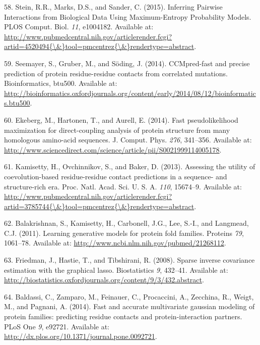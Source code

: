 \documentclass[12pt,a4paper,twoside]{book}
\theoremstyle{definition}
\theoremstyle{definition}
\theoremstyle{remark}
\begin{document}
\hypertarget{ref-Stein2015a}{}
58. Stein, R.R., Marks, D.S., and Sander, C. (2015). Inferring Pairwise
Interactions from Biological Data Using Maximum-Entropy Probability
Models. PLOS Comput. Biol. \emph{11}, e1004182. Available at:
\href{http://www.pubmedcentral.nih.gov/articlerender.fcgi?artid=4520494\%7B/\&\%7Dtool=pmcentrez\%7B/\&\%7Drendertype=abstract}{http://www.pubmedcentral.nih.gov/articlerender.fcgi?artid=4520494\{\textbackslash{}\&\}tool=pmcentrez\{\textbackslash{}\&\}rendertype=abstract}.

\hypertarget{ref-Seemayer2014}{}
59. Seemayer, S., Gruber, M., and Söding, J. (2014). CCMpred-fast and
precise prediction of protein residue-residue contacts from correlated
mutations. Bioinformatics, btu500. Available at:
\url{http://bioinformatics.oxfordjournals.org/content/early/2014/08/12/bioinformatics.btu500}.

\hypertarget{ref-Ekeberg2014}{}
60. Ekeberg, M., Hartonen, T., and Aurell, E. (2014). Fast
pseudolikelihood maximization for direct-coupling analysis of protein
structure from many homologous amino-acid sequences. J. Comput. Phys.
\emph{276}, 341--356. Available at:
\url{http://www.sciencedirect.com/science/article/pii/S0021999114005178}.

\hypertarget{ref-Kamisetty2013}{}
61. Kamisetty, H., Ovchinnikov, S., and Baker, D. (2013). Assessing the
utility of coevolution-based residue-residue contact predictions in a
sequence- and structure-rich era. Proc. Natl. Acad. Sci. U. S. A.
\emph{110}, 15674--9. Available at:
\href{http://www.pubmedcentral.nih.gov/articlerender.fcgi?artid=3785744\%7B/\&\%7Dtool=pmcentrez\%7B/\&\%7Drendertype=abstract}{http://www.pubmedcentral.nih.gov/articlerender.fcgi?artid=3785744\{\textbackslash{}\&\}tool=pmcentrez\{\textbackslash{}\&\}rendertype=abstract}.

\hypertarget{ref-Balakrishnan2011}{}
62. Balakrishnan, S., Kamisetty, H., Carbonell, J.G., Lee, S.-I., and
Langmead, C.J. (2011). Learning generative models for protein fold
families. Proteins \emph{79}, 1061--78. Available at:
\url{http://www.ncbi.nlm.nih.gov/pubmed/21268112}.

\hypertarget{ref-Friedman2008}{}
63. Friedman, J., Hastie, T., and Tibshirani, R. (2008). Sparse inverse
covariance estimation with the graphical lasso. Biostatistics \emph{9},
432--41. Available at:
\url{http://biostatistics.oxfordjournals.org/content/9/3/432.abstract}.

\hypertarget{ref-Baldassi2014}{}
64. Baldassi, C., Zamparo, M., Feinauer, C., Procaccini, A., Zecchina,
R., Weigt, M., and Pagnani, A. (2014). Fast and accurate multivariate
gaussian modeling of protein families: predicting residue contacts and
protein-interaction partners. PLoS One \emph{9}, e92721. Available at:
\url{http://dx.plos.org/10.1371/journal.pone.0092721}.
\end{document}
